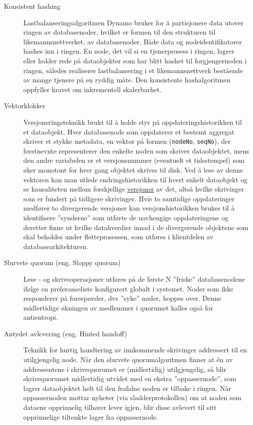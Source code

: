 \begin{description}
  \item [Konsistent hashing] Lastbalanseringsalgoritmen Dynamo bruker for å partisjonere data utover ringen av databasenoder, hvilket er formen til den strukturen til likemannsnettverket, av databasenoder. Både data og nodeidentifikatorer hashes inn i ringen. En node, det vil si en tjenerprosess i ringen, lagrer eller holder rede på dataobjekter som har blitt hashet til forgjengernoden i ringen, således realiseres lastbalansering i et likemannsnettverk bestående av mange tjenere på en ryddig måte. Den konsistente hashalgoritmen oppfyller kravet om inkrementell skalerbarhet.
  \item [Vektorklokker] Versjoneringsteknikk brukt til å holde styr på oppdateringshistorikken til et dataobjekt. Hver databasenode som oppdaterer et bestemt aggregat skriver et stykke metadata, en vektor på formen (\texttt{nodeNo}, \texttt{seqNo}), der førstnevnte representerer den enkelte noden som skriver dataobjektet, mens den andre variabelen er et versjonsnummer (eventuelt et tidsstempel) som øker monotont for hver gang objektet skrives til disk. Ved å lese av denne vektoren kan man utlede endringshistorikken til hvert enkelt dataobjekt og se kausaliteten mellom forskjellige \underline{versjoner} av det, altså hvilke skrivinger som er fundert på tidligere skrivinger. Hvis to samtidige oppdateringer medfører to divergerende versjoner kan versjonshistorikken brukes til å identifisere ''synderne'' som utførte de uavhengige oppdateringene og deretter finne ut hvilke datahverdier innad i de divergerende objektene som skal beholdes under fletteprosessen, som utføres i klientdelen av databasearkitekturen.
  \item [Slurvete quorum (eng. Sloppy quorum)] Lese - og skriveoperasjoner utføres på de første N ''friske'' databasenodene ifølge en preferanseliste konfigurert globalt i systemet. Noder som ikke responderer på forespørsler, dvs ''syke'' noder, hoppes over. Denne midlertidige økningen av medlemmer i quorumet kalles også for antientropi.
  \item [Antydet avlevering (eng. Hinted handoff)] Teknikk for hurtig handtering av innkommende skrivinger addressert til en utilgjengelig node. Når den slurvete quorumalgoritmen finner at én av addressentene i skrivequorumet er (midlertidig) utilgjengelig, så blir skrivequorumet midlertidig utvidet med en ekstra ''oppassernode'', som lagrer dataobjektet helt til den frafalne noden er tilbake i ringen. Når oppassernoden mottar nyheter (via sladderprotokollen) om at noden som dataene opprinnelig tilhører lever igjen, blir disse avlevert til sitt opprinnelige tiltenkte lager fra oppassernode.

\end{description}
